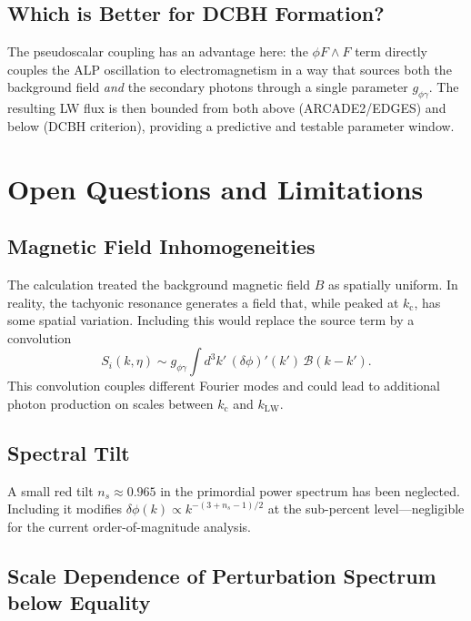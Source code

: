 \documentclass[12pt,a4paper]{report}
\newcommand{\kc}{k_{\mathrm{c}}}
\newcommand{\gag}{g_{\phi\gamma}}
\newcommand{\LW}{\mathrm{LW}}
\theoremstyle{definition}
\begin{document}
\section{Which is Better for DCBH Formation?}

The pseudoscalar coupling has an advantage here: the $\phi F\wedge F$ term directly
couples the ALP oscillation to electromagnetism in a way that sources both the
background field \emph{and} the secondary photons through a single parameter $\gag$.
The resulting LW flux is then bounded from both above (ARCADE2/EDGES) and below (DCBH
criterion), providing a predictive and testable parameter window.

\chapter{Open Questions and Limitations}

\section{Magnetic Field Inhomogeneities}

The calculation treated the background magnetic field $B$ as spatially uniform.
In reality, the tachyonic resonance generates a field that, while peaked at $\kc$,
has some spatial variation. Including this would replace the source term by a
convolution
\begin{equation}
  S_i(k,\eta) \sim \gag\int d^3k'\,(\delta\phi)'(k')\,\mathcal{B}(k-k').
\end{equation}
This convolution couples different Fourier modes and could lead to additional photon
production on scales between $\kc$ and $k_{\LW}$.

\section{Spectral Tilt}

A small red tilt $n_s\approx 0.965$ in the primordial power spectrum has been
neglected. Including it modifies $\delta\phi(k)\propto k^{-(3+n_s-1)/2}$
at the sub-percent level---negligible for the current order-of-magnitude analysis.

\section{Scale Dependence of Perturbation Spectrum below Equality}
\end{document}
